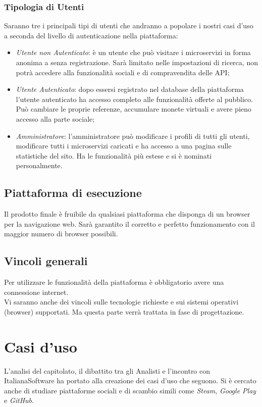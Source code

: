 \documentclass[12pt,a4paper,titlepage]{article}
\begin{document}
	\subsubsection{Tipologia di Utenti}
	Saranno tre i principali tipi di utenti che andranno a popolare i nostri casi d'uso a seconda del livello di autenticazione nella piattaforma:
	\begin{itemize}
		\item \textit{Utente non Autenticato}: è un utente che può visitare i microservizi in forma anonima a senza registrazione. Sarà limitato nelle impostazioni di ricerca, non potrà accedere alla funzionalità sociali e di compravendita delle API;
		\item \textit{Utente Autenticato}: dopo essersi registrato nel database della piattaforma l'utente autenticato ha accesso completo alle funzionalità offerte al pubblico. Può cambiare le proprie referenze, accumulare monete virtuali e avere pieno accesso alla parte sociale;
		\item \textit{Amministratore}: l'amministratore può modificare i profili di tutti gli utenti, modificare tutti i microservizi caricati e ha accesso a una pagina sulle statistiche del sito. Ha le funzionalità più estese e si è nominati personalmente. 
	\end{itemize}
	
	\subsection{Piattaforma di esecuzione}
	Il prodotto finale è fruibile da qualsiasi piattaforma che disponga di un browser per la navigazione web. Sarà garantito il corretto e perfetto funzionamento con il maggior numero di browser possibili. 
	
	\subsection{Vincoli generali}
	Per utilizzare le funzionalità della piattaforma è obbligatorio avere una connessione internet.\\
	Vi saranno anche dei vincoli sulle tecnologie richieste e sui sistemi operativi (browser) supportati. Ma questa parte verrà trattata in fase di progettazione.
	\newpage
	
	\section{Casi d'uso}
	L'analisi del capitolato, il dibattito tra gli Analisti e l'incontro con ItalianaSoftware ha portato alla creazione dei casi d'uso che seguono. Si è cercato anche di studiare piattaforme sociali e di scambio simili come \textit{Steam}, \textit{Google Play} e \textit{GitHub}.
	
\end{document}
